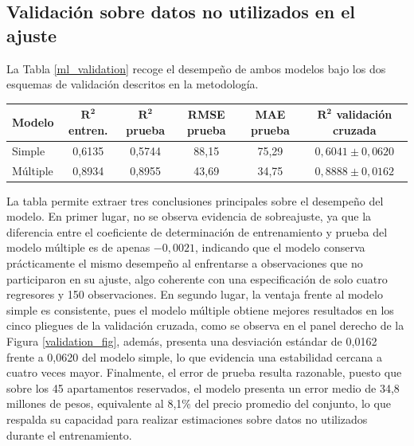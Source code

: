     \subsection{Validación sobre datos no utilizados en el ajuste}
        La Tabla \ref{ml_validation} recoge el desempeño de ambos modelos bajo los
        dos esquemas de validación descritos en la metodología.

        \begin{strip}
            \centering
            \label{ml_validation}
            \begin{center}
                \begin{tabular}{|l|c|c|c|c|c|}
                    \hline
                    \textbf{Modelo} & $\mathbf{R^{2}}$ \textbf{entren.} &
                    $\mathbf{R^{2}}$ \textbf{prueba} & \textbf{RMSE prueba} &
                    \textbf{MAE prueba} & $\mathbf{R^{2}}$ \textbf{validación
                    cruzada} \\
                    \hline
                    Simple & 0,6135 & 0,5744 & 88,15 & 75,29 &
                    $0{,}6041 \pm 0{,}0620$ \\
                    \hline
                    Múltiple & 0,8934 & 0,8955 & 43,69 & 34,75 &
                    $0{,}8888 \pm 0{,}0162$ \\
                    \hline
                \end{tabular}
            \end{center}
        \end{strip}

        La tabla permite extraer tres conclusiones principales sobre el
        desempeño del modelo. En primer lugar, no se observa evidencia de
        sobreajuste, ya que la diferencia entre el coeficiente de determinación
        de entrenamiento y prueba del modelo múltiple es de apenas $-0{,}0021$,
        indicando que el modelo conserva prácticamente el mismo desempeño al
        enfrentarse a observaciones que no participaron en su ajuste, algo
        coherente con una especificación de solo cuatro regresores y 150
        observaciones. En segundo lugar, la ventaja frente al modelo simple es
        consistente, pues el modelo múltiple obtiene mejores resultados en los
        cinco pliegues de la validación cruzada, como se observa en el panel
        derecho de la Figura \ref{validation_fig}, además, presenta una
        desviación estándar de 0,0162 frente a 0,0620 del modelo simple, lo que
        evidencia una estabilidad cercana a cuatro veces mayor. Finalmente, el
        error de prueba resulta razonable, puesto que sobre los 45 apartamentos 
        reservados, el modelo presenta un error medio de 34,8 millones de pesos, 
        equivalente al 8,1\% del precio promedio del conjunto, lo que respalda 
        su capacidad para realizar estimaciones sobre datos no utilizados durante 
        el entrenamiento.

